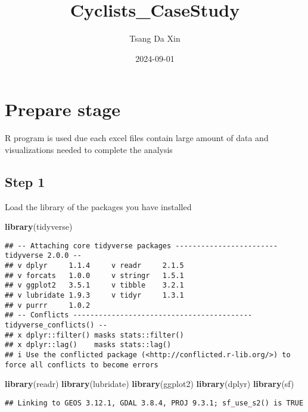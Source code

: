 \documentclass[
]{article}
\title{Cyclists\_CaseStudy}
\author{Tsang Da Xin}
\date{2024-09-01}
\newenvironment{Shaded}{\begin{snugshade}}{\end{snugshade}}
\newcommand{\FunctionTok}[1]{\textcolor[rgb]{0.13,0.29,0.53}{\textbf{#1}}}
\newcommand{\NormalTok}[1]{#1}
\begin{document}
\maketitle

\section{Prepare stage}\label{prepare-stage}

R program is used due each excel files contain large amount of data and
visualizations needed to complete the analysis

\subsection{Step 1}\label{step-1}

Load the library of the packages you have installed

\begin{Shaded}
\begin{Highlighting}[]
\FunctionTok{library}\NormalTok{(tidyverse)}
\end{Highlighting}
\end{Shaded}

\begin{verbatim}
## -- Attaching core tidyverse packages ------------------------ tidyverse 2.0.0 --
## v dplyr     1.1.4     v readr     2.1.5
## v forcats   1.0.0     v stringr   1.5.1
## v ggplot2   3.5.1     v tibble    3.2.1
## v lubridate 1.9.3     v tidyr     1.3.1
## v purrr     1.0.2     
## -- Conflicts ------------------------------------------ tidyverse_conflicts() --
## x dplyr::filter() masks stats::filter()
## x dplyr::lag()    masks stats::lag()
## i Use the conflicted package (<http://conflicted.r-lib.org/>) to force all conflicts to become errors
\end{verbatim}

\begin{Shaded}
\begin{Highlighting}[]
\FunctionTok{library}\NormalTok{(readr)}
\FunctionTok{library}\NormalTok{(lubridate)}
\FunctionTok{library}\NormalTok{(ggplot2)}
\FunctionTok{library}\NormalTok{(dplyr)}
\FunctionTok{library}\NormalTok{(sf)}
\end{Highlighting}
\end{Shaded}

\begin{verbatim}
## Linking to GEOS 3.12.1, GDAL 3.8.4, PROJ 9.3.1; sf_use_s2() is TRUE
\end{verbatim}
\end{document}
